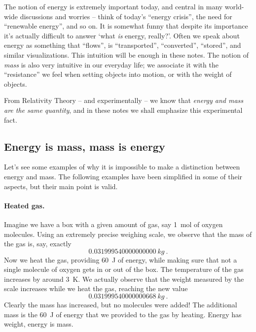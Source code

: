\documentclass[a4paper,12pt,%
onecolumn,oneside,%
british%
]{memoir}
\renewcommand*{\|}[1][]{\nonscript\:#1\vert\nonscript\:\mathopen{}}
\begin{document}
The notion of energy is extremely important today, and central in many world-wide discussions and worries -- think of today's \enquote{energy crisis}, the need for \enquote{renewable energy}, and so on. It is somewhat funny that despite its importance it's actually difficult to answer \enquote*{what \emph{is} energy, really?}. Often we speak about energy as something that \enquote{flows}, is \enquote{transported}, \enquote{converted}, \enquote{stored}, and similar visualizations. This intuition will be enough in these notes. The notion of \emph{mass} is also very intuitive in our everyday life; we associate it with the \enquote{resistance} we feel when setting objects into motion, or with the weight of objects.

From Relativity Theory -- and experimentally -- we know that \emph{energy and mass are the same quantity}, and in these notes we shall emphasize this experimental fact.


\subsection{Energy is mass, mass is energy}
\label{sec:mass_is_energy}

Let's see some examples of why it is impossible to make a distinction between energy and mass. The following examples have been simplified in some of their aspects, but their main point is valid.

\paragraph{Heated gas.}

Imagine we have a box with a given amount of gas, say \qty{1}{mol} of oxygen molecules. Using an extremely precise weighing scale, we observe that the mass of the gas is, say, exactly
\begin{equation*}
  \qty{0.031999540000000000}{kg} \ .
\end{equation*}
Now we heat the gas, providing \qty{60}{J} of energy, while making sure that not a single molecule of oxygen gets in or out of the box. The temperature of the gas increases by around \qty{3}{K}. We actually observe that the weight measured by the scale increases while we heat the gas, reaching the new value
\begin{equation*}
  \qty{0.031999540000000668}{kg} \ .
\end{equation*}
Clearly the mass has increased, but no molecules were added! The additional mass is the \qty{60}{J} of energy that we provided to the gas by heating. Energy has weight, energy is mass.
\end{document}
